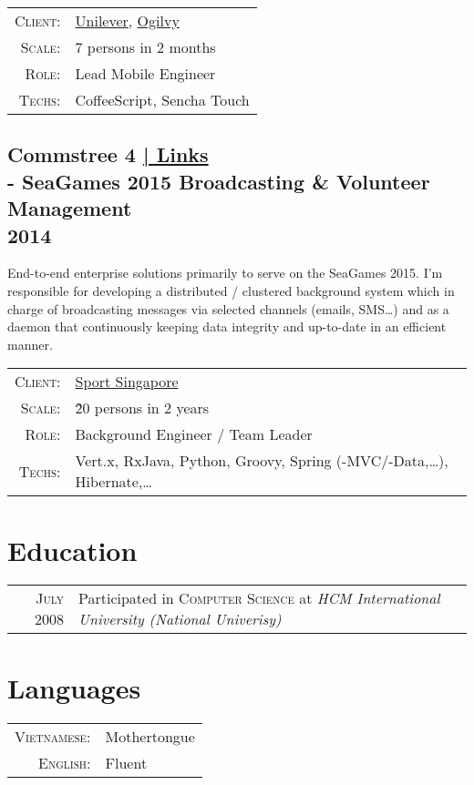 \documentclass[a4paper,10pt]{article}
\begin{document}
\begin{tabular}{rl}
    \textsc{Client:} & \href{http://www.unilever.com/}{Unilever}, \href{http://www.ogilvy.com/}{Ogilvy}\\
    \textsc{Scale:} & 7 persons in 2 months\\
    \textsc{Role}: & Lead Mobile Engineer\\
    \textsc{Techs:} & CoffeeScript, Sencha Touch\\
\end{tabular}

\subsection*{Commstree 4 \hfill \footnotesize {\hyperlink{ct-links}{| Links}}\\\large - SeaGames 2015 Broadcasting \& Volunteer Management\\\small 2014}
End-to-end enterprise solutions primarily to serve on the SeaGames 2015. I'm responsible for developing a distributed / clustered background system which in charge of broadcasting messages via selected channels (emails, SMS\ldots) and as a daemon that continuously keeping data integrity and up-to-date in an efficient manner.

\begin{tabular}{rl}
    \textsc{Client:} & \href{http://www.sportsingapore.gov.sg/}{Sport Singapore}\\
    \textsc{Scale:} & \~20 persons in 2 years\\
    \textsc{Role:} & Background Engineer / Team Leader\\ 
    \textsc{Techs:} & Vert.x, RxJava, Python, Groovy, Spring (-MVC/-Data,\ldots), Hibernate,\ldots\\
\end{tabular}
    


\hfill
\section{Education}
\begin{tabular}{rl}	
    \textsc{July} 2008 & Participated in \textsc{Computer Science} at \textit{HCM International University (National Univerisy)}
\end{tabular}


\section{Languages}
\begin{tabular}{rl}
 \textsc{Vietnamese:}&Mothertongue\\
\textsc{English:}&Fluent\\
\end{tabular}
\end{document}
